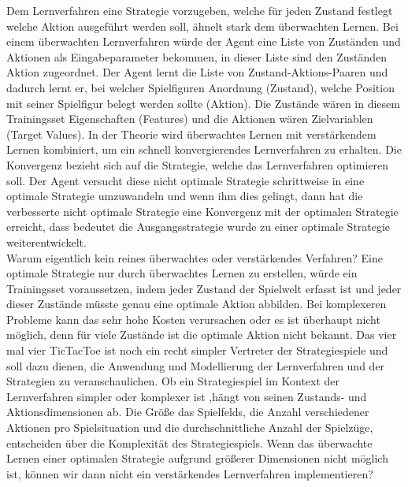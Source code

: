 Dem Lernverfahren eine Strategie vorzugeben, welche für jeden Zustand festlegt welche Aktion ausgeführt werden soll, ähnelt stark dem überwachten Lernen. Bei einem überwachten Lernverfahren würde der Agent eine Liste von Zuständen und Aktionen als Eingabeparameter bekommen, in dieser Liste sind den Zuständen Aktion zugeordnet. Der Agent lernt die Liste von Zustand-Aktions-Paaren und dadurch lernt er, bei welcher Spielfiguren Anordnung (Zustand), welche Position mit seiner Spielfigur belegt werden sollte (Aktion). Die Zustände wären in diesem Trainingsset Eigenschaften (Features) und die Aktionen wären Zielvariablen (Target Values). In der Theorie wird überwachtes Lernen mit verstärkendem Lernen kombiniert, um ein schnell konvergierendes Lernverfahren zu erhalten. Die Konvergenz bezieht sich auf die Strategie, welche das Lernverfahren optimieren soll. Der Agent versucht diese nicht optimale Strategie schrittweise in eine optimale Strategie umzuwandeln und wenn ihm dies gelingt, dann hat die verbesserte nicht optimale Strategie eine Konvergenz mit der optimalen Strategie erreicht, dass bedeutet die Ausgangsstrategie wurde zu einer optimale Strategie weiterentwickelt. \\

Warum eigentlich kein reines überwachtes oder verstärkendes Verfahren? Eine optimale Strategie nur durch überwachtes Lernen zu erstellen, würde ein Trainingsset voraussetzen, indem jeder Zustand der Spielwelt erfasst ist und jeder dieser Zustände müsste genau eine optimale Aktion abbilden. Bei komplexeren Probleme kann das sehr hohe Kosten verursachen oder es ist überhaupt nicht möglich, denn für viele Zustände ist die optimale Aktion nicht bekannt. Das vier mal vier TicTacToe ist noch ein recht simpler Vertreter der Strategiespiele und soll dazu dienen, die Anwendung und Modellierung der Lernverfahren und der Strategien zu veranschaulichen. Ob ein Strategiespiel im Kontext der Lernverfahren simpler oder komplexer ist ,hängt von seinen Zustands- und Aktionsdimensionen ab. Die Größe das Spielfelds, die Anzahl verschiedener Aktionen pro Spielsituation und die durchschnittliche Anzahl der Spielzüge, entscheiden über die Komplexität des Strategiespiels. Wenn das überwachte Lernen einer optimalen Strategie aufgrund größerer Dimensionen nicht möglich ist, können wir dann nicht ein verstärkendes Lernverfahren implementieren? \\


